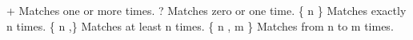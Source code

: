 \documentclass[11pt]{article}
\begin{document}
\begin{CJK*}{UTF8}{gbsn}
                                                                              +   Matches one or more times.                                                                                                                                                     ?   Matches zero or one time.                                                                                                                                                      \{ n \}       Matches exactly n times.                                                                                                                                               \{ n ,\}      Matches at least n times.                                                                                                                                              \{ n , m \}   Matches from n to m times.                                                                                                              

\end{CJK*}
\end{document}
